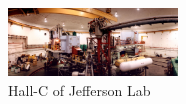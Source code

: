 \usepackage{graphicx}

\begin{figure}[h]
	\centering
		\includegraphics[width=0.40\textwidth]{HALC_33.jpg}
	\caption{Hall-C of Jefferson Lab}
	\label{fig:HALC_33}
\end{figure}
